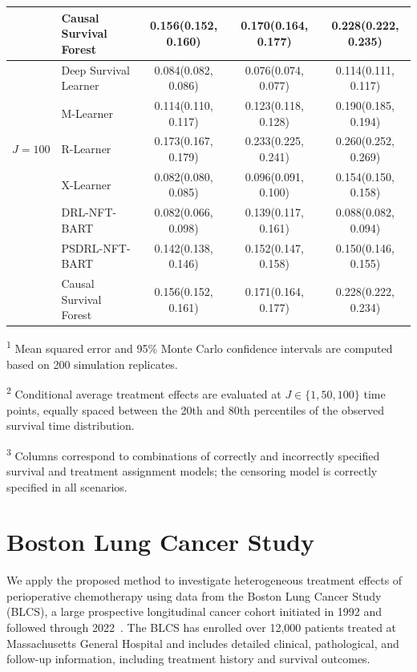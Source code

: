 \documentclass{article}
\begin{document}
\begin{table}[ht]
\begin{threeparttable}
{\begin{tabular}{llccc}
    &Causal Survival Forest& 0.156(0.152, 0.160) & 0.170(0.164, 0.177) & 0.228(0.222, 0.235)\\
             \hline
    \multirow{5}{*}{\(J = 100\)}
    &Deep Survival Learner & 0.084(0.082, 0.086) & 0.076(0.074, 0.077) & 0.114(0.111, 0.117)\\
    &M-Learner             & 0.114(0.110, 0.117) & 0.123(0.118, 0.128) & 0.190(0.185, 0.194)\\
    &R-Learner             & 0.173(0.167, 0.179) & 0.233(0.225, 0.241) & 0.260(0.252, 0.269)\\
    &X-Learner             & 0.082(0.080, 0.085) & 0.096(0.091, 0.100) & 0.154(0.150, 0.158)\\
    &DRL-NFT-BART          & 0.082(0.066, 0.098) & 0.139(0.117, 0.161) & 0.088(0.082, 0.094)\\
    &PSDRL-NFT-BART        & 0.142(0.138, 0.146) & 0.152(0.147, 0.158) & 0.150(0.146, 0.155)\\
    &Causal Survival Forest& 0.156(0.152, 0.161) & 0.171(0.164, 0.177) & 0.228(0.222, 0.234)\\
             \hline
        \end{tabular}}
     \begin{tablenotes}\footnotesize
\item \textsuperscript{1} Mean squared error and 95\% Monte Carlo confidence intervals are computed based on 200 simulation replicates.
\item \textsuperscript{2} Conditional average treatment effects are evaluated at \(J \in \{1, 50, 100\}\) time points, equally spaced between the 20th and 80th percentiles of the observed survival time distribution.
\item \textsuperscript{3} Columns correspond to combinations of correctly and incorrectly specified survival and treatment assignment models; the censoring model is correctly specified in all scenarios.
\end{tablenotes}
    \end{threeparttable}
\end{table}

 \section{Boston Lung Cancer Study}
\label{BLCS}
{ We apply the proposed method to investigate heterogeneous treatment effects of perioperative chemotherapy using data from the Boston Lung Cancer Study (BLCS), a large prospective longitudinal cancer cohort initiated in 1992 and followed through 2022~\citep{zhai2022spirometry,alvarez2025effects,wang2023prediagnosis}. The BLCS has enrolled over 12{,}000 patients treated at Massachusetts General Hospital and includes detailed clinical, pathological, and follow-up information, including treatment history and survival outcomes.}
\end{document}
